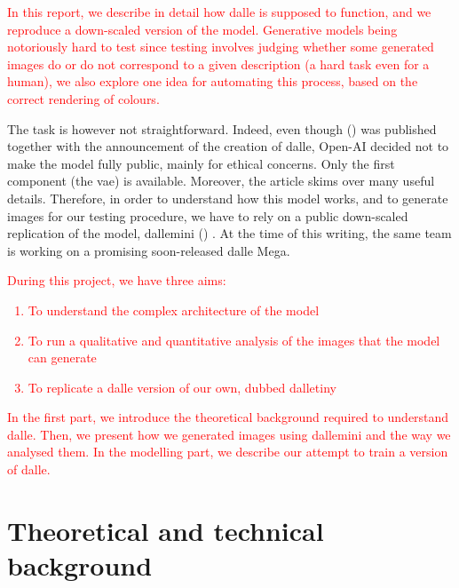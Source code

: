 \documentclass{article}
\begin{document}
\begin{multicols}{2}
\textcolor{red}{In this report, we describe in detail how \gls{dalle} is supposed to function, and we reproduce a down-scaled version of the model. Generative models being notoriously hard to test since testing involves judging whether some generated images do or do not correspond to a given description (a hard task even for a human), we also explore one idea for automating this process, based on the correct rendering of colours.}

The task is however not straightforward. Indeed, even though  (\cite{zeroshot}) was published together with the announcement of the creation of \gls{dalle}, Open-AI decided not to make the model fully public, mainly for ethical concerns. Only the first component (the \gls{vae}) is available. Moreover, the article skims over many useful details. Therefore, in order to understand how this model works, and to generate images for our testing procedure, we have to rely on a public down-scaled replication of the model, \gls{dallemini} (\cite{wandbdallemini})
. At the time of this writing, the same team is working on a promising soon-released \gls{dalle} Mega.


\textcolor{red}{
During this project, we have three aims:
\begin{enumerate}
    \item To understand the complex architecture of the model
    \item To run a qualitative and quantitative analysis of the images that the model can generate
    \item To replicate a \gls{dalle} version of our own, dubbed \gls{dalletiny}
\end{enumerate}
}

\textcolor{red}{
In the first part, we introduce the theoretical background required to understand \gls{dalle}. Then, we present how we generated images using \gls{dallemini}  and the way we analysed them. In the modelling part, we describe our attempt to train a version of \gls{dalle}.
}

\end{multicols}

\pagebreak

\section{Theoretical and technical background}
\end{document}
